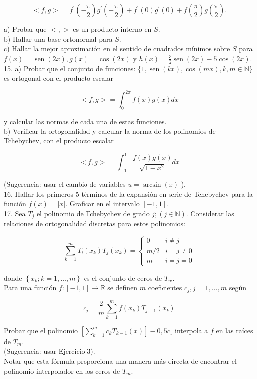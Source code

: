 \documentclass[10pt]{article}
\begin{document}
$$
<f, g>=f^{\prime}\left(-\frac{\pi}{2}\right) g^{\prime}\left(-\frac{\pi}{2}\right)+f^{\prime}(0) g^{\prime}(0)+f\left(\frac{\pi}{2}\right) g\left(\frac{\pi}{2}\right) .
$$

a) Probar que $<,>$ es un producto interno en $S$.\\
b) Hallar una base ortonormal para $S$.\\
c) Hallar la mejor aproximación en el sentido de cuadrados mínimos sobre $S$ para $f(x)=\operatorname{sen}(2 x), g(x)=\cos (2 x)$ y $h(x)=\frac{3}{2} \operatorname{sen}(2 x)-5 \cos (2 x)$.\\
15. a) Probar que el conjunto de funciones: $\{1, \operatorname{sen}(k x), \cos (m x), k, m \in \mathbb{N}\}$ es ortogonal con el producto escalar

$$
<f, g>=\int_{0}^{2 \pi} f(x) g(x) d x
$$

y calcular las normas de cada una de estas funciones.\\
b) Verificar la ortogonalidad y calcular la norma de los polinomios de Tchebychev, con el producto escalar

$$
<f, g>=\int_{-1}^{1} \frac{f(x) g(x)}{\sqrt{1-x^{2}}} d x
$$

(Sugerencia: usar el cambio de variables $u=\arcsin (x)$ ).\\
16. Hallar los primeros 5 términos de la expansión en serie de Tchebychev para la función $f(x)=|x|$. Graficar en el intervalo $[-1,1]$.\\
17. Sea $T_{j}$ el polinomio de Tchebychev de grado $j ;(j \in \mathbb{N})$. Considerar las relaciones de ortogonalidad discretas para estos polinomios:

$$
\sum_{k=1}^{m} T_{i}\left(x_{k}\right) T_{j}\left(x_{k}\right)= \begin{cases}0 & i \neq j \\ m / 2 & i=j \neq 0 \\ m & i=j=0\end{cases}
$$

donde $\left\{x_{k} ; k=1, \ldots, m\right\}$ es el conjunto de ceros de $T_{m}$.\\
Para una función $f:[-1,1] \rightarrow \mathbb{R}$ se definen $m$ coeficientes $c_{j}, j=1, \ldots, m$ según

$$
c_{j}=\frac{2}{m} \sum_{k=1}^{m} f\left(x_{k}\right) T_{j-1}\left(x_{k}\right)
$$

Probar que el polinomio $\left[\sum_{k=1}^{m} c_{k} T_{k-1}(x)\right]-0,5 c_{1}$ interpola a $f$ en las raíces de $T_{m}$.\\
(Sugerencia: usar Ejercicio 3).\\
Notar que esta fórmula proporciona una manera más directa de encontrar el polinomio interpolador en los ceros de $T_{m}$.
\end{document}
